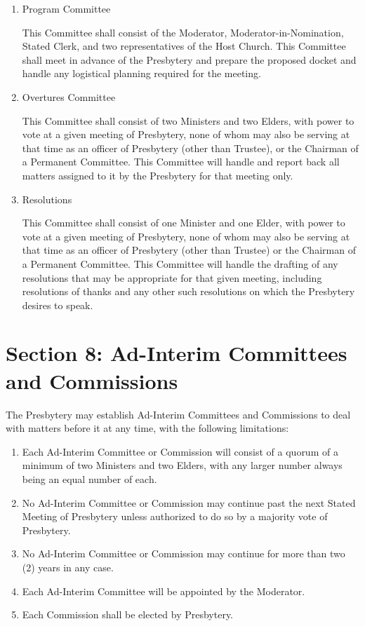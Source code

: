 \documentclass[
]{book}
\providecommand{\tightlist}{%
  \setlength{\itemsep}{0pt}\setlength{\parskip}{0pt}}
\begin{document}
\begin{enumerate}
\def\labelenumi{\Alph{enumi}.}
\item
  Program Committee

  This Committee shall consist of the Moderator, Moderator-in-Nomination, Stated Clerk, and two representatives of the Host Church. This Committee shall meet in advance of the Presbytery and prepare the proposed docket and handle any logistical planning required for the meeting.
\item
  Overtures Committee

  This Committee shall consist of two Ministers and two Elders, with power to vote at a given meeting of Presbytery, none of whom may also be serving at that time as an officer of Presbytery (other than Trustee), or the Chairman of a Permanent Committee. This Committee will handle and report back all matters assigned to it by the Presbytery for that meeting only.
\item
  Resolutions

  This Committee shall consist of one Minister and one Elder, with power to vote at a given meeting of Presbytery, none of whom may also be serving at that time as an officer of Presbytery (other than Trustee) or the Chairman of a Permanent Committee. This Committee will handle the drafting of any resolutions that may be appropriate for that given meeting, including resolutions of thanks and any other such resolutions on which the Presbytery desires to speak.
\end{enumerate}

\hypertarget{section-8-ad-interim-committees-and-commissions}{%
\section*{Section 8: Ad-Interim Committees and Commissions}\label{section-8-ad-interim-committees-and-commissions}}

The Presbytery may establish Ad-Interim Committees and Commissions to deal with matters before it at any time, with the following limitations:

\begin{enumerate}
\def\labelenumi{\Alph{enumi}.}
\tightlist
\item
  Each Ad-Interim Committee or Commission will consist of a quorum of a minimum of two Ministers and two Elders, with any larger number always being an equal number of each.
\item
  No Ad-Interim Committee or Commission may continue past the next Stated Meeting of Presbytery unless authorized to do so by a majority vote of Presbytery.
\item
  No Ad-Interim Committee or Commission may continue for more than two (2) years in any case.
\item
  Each Ad-Interim Committee will be appointed by the Moderator.
\item
  Each Commission shall be elected by Presbytery.
\end{enumerate}
\end{document}
